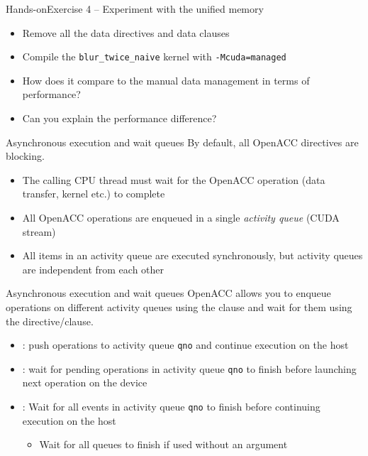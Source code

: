 \documentclass[12pt,aspectratio=169]{beamer}
\begin{document}
\begin{frame}{Hands-on}{Exercise 4 -- Experiment with the unified memory}
  \begin{itemize}
  \item Remove all the data directives and data clauses
  \item Compile the \texttt{blur\_twice\_naive} kernel with \texttt{-Mcuda=managed}
  \item How does it compare to the manual data management in terms of performance?
  \item Can you explain the performance difference?
  \end{itemize}
\end{frame}


\begin{frame}{Asynchronous execution and wait queues}
  By default, all OpenACC directives are blocking.
  \vspace\baselineskip
  \begin{itemize}
  \item The calling CPU thread must wait for the OpenACC operation (data
    transfer, kernel etc.) to complete
  \item All OpenACC operations are enqueued in a single \emph{activity queue} (CUDA stream)
  \item All items in an activity queue are executed synchronously, but activity queues are independent from each other
  \end{itemize}
\end{frame}

\begin{frame}{Asynchronous execution and wait queues}
  OpenACC allows you to enqueue operations on different activity queues using the  clause and wait for them using the  directive/clause.
  \vfill
  \begin{itemize}
  \item {}: push operations to activity queue \texttt{qno} and continue execution on the host
  \item {}: wait for pending operations in activity queue \texttt{qno} to finish before launching next operation on the device
  \item {}: Wait for all events in activity queue \texttt{qno} to finish before continuing execution on the host
    \begin{itemize}
    \item Wait for all queues to finish if used without an argument
    \end{itemize}
  \end{itemize}
\end{frame}
\end{document}

